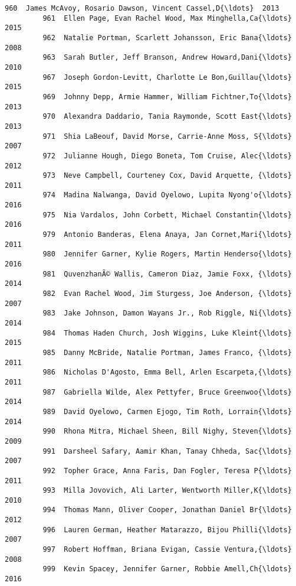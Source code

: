 \documentclass[11pt]{article}
\begin{document}
\begin{Verbatim}[commandchars=\\\{\}]
         960  James McAvoy, Rosario Dawson, Vincent Cassel,D{\ldots}  2013   
         961  Ellen Page, Evan Rachel Wood, Max Minghella,Ca{\ldots}  2015   
         962  Natalie Portman, Scarlett Johansson, Eric Bana{\ldots}  2008   
         963  Sarah Butler, Jeff Branson, Andrew Howard,Dani{\ldots}  2010   
         967  Joseph Gordon-Levitt, Charlotte Le Bon,Guillau{\ldots}  2015   
         969  Johnny Depp, Armie Hammer, William Fichtner,To{\ldots}  2013   
         970  Alexandra Daddario, Tania Raymonde, Scott East{\ldots}  2013   
         971  Shia LaBeouf, David Morse, Carrie-Anne Moss, S{\ldots}  2007   
         972  Julianne Hough, Diego Boneta, Tom Cruise, Alec{\ldots}  2012   
         973  Neve Campbell, Courteney Cox, David Arquette, {\ldots}  2011   
         974  Madina Nalwanga, David Oyelowo, Lupita Nyong'o{\ldots}  2016   
         975  Nia Vardalos, John Corbett, Michael Constantin{\ldots}  2016   
         979  Antonio Banderas, Elena Anaya, Jan Cornet,Mari{\ldots}  2011   
         980  Jennifer Garner, Kylie Rogers, Martin Henderso{\ldots}  2016   
         981  QuvenzhanÃ© Wallis, Cameron Diaz, Jamie Foxx, {\ldots}  2014   
         982  Evan Rachel Wood, Jim Sturgess, Joe Anderson, {\ldots}  2007   
         983  Jake Johnson, Damon Wayans Jr., Rob Riggle, Ni{\ldots}  2014   
         984  Thomas Haden Church, Josh Wiggins, Luke Kleint{\ldots}  2015   
         985  Danny McBride, Natalie Portman, James Franco, {\ldots}  2011   
         986  Nicholas D'Agosto, Emma Bell, Arlen Escarpeta,{\ldots}  2011   
         987  Gabriella Wilde, Alex Pettyfer, Bruce Greenwoo{\ldots}  2014   
         989  David Oyelowo, Carmen Ejogo, Tim Roth, Lorrain{\ldots}  2014   
         990  Rhona Mitra, Michael Sheen, Bill Nighy, Steven{\ldots}  2009   
         991  Darsheel Safary, Aamir Khan, Tanay Chheda, Sac{\ldots}  2007   
         992  Topher Grace, Anna Faris, Dan Fogler, Teresa P{\ldots}  2011   
         993  Milla Jovovich, Ali Larter, Wentworth Miller,K{\ldots}  2010   
         994  Thomas Mann, Oliver Cooper, Jonathan Daniel Br{\ldots}  2012   
         996  Lauren German, Heather Matarazzo, Bijou Philli{\ldots}  2007   
         997  Robert Hoffman, Briana Evigan, Cassie Ventura,{\ldots}  2008   
         999  Kevin Spacey, Jennifer Garner, Robbie Amell,Ch{\ldots}  2016   
         

\end{Verbatim}
\end{document}
